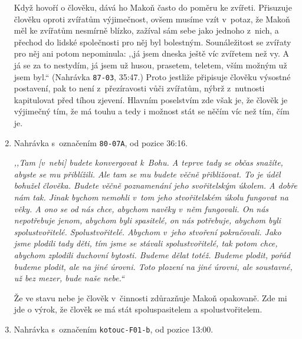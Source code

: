 \begin{enumerate}
{Když hovoří o člověku, dává ho Makoň často do poměru ke zvířeti. Přisuzuje
člověku oproti zvířatům výjimečnost, ovšem musíme vzít v~potaz, že Makoň měl ke
zvířatům nesmírně blízko, zažíval sám sebe jako jednoho z~nich, a přechod do
lidské společnosti pro něj byl bolestným\cite{KaMaUZ}. Sounáležitost se zvířaty
pro něj ani potom nepominula: ,,já jsem dneska ještě víc zvířetem než vy. A já
se za to nestydím, já jsem už husou, prasetem, teletem, vším možným už jsem
byl.`` (Nahrávka \texttt{87-03}, 35:47.) Proto jestliže připisuje člověku
výsostné postavení, pak to není z~přezíravosti vůči zvířatům, nýbrž z~nutnosti
kapitulovat před tíhou zjevení.
Hlavním poselstvím zde však je, že člověk je výjimečný tím, že má touhu a tedy i
možnost stát se něčím víc než tím, čím je.

}

\item{
Nahrávka s~označením \texttt{80-07A}, od pozice 36:16.

\textit{%
,,Tam [v~nebi] budete konvergovat k~Bohu. A teprve tady se občas snažíte, abyste se mu
přiblížili. Ale tam se mu budete věčně přibližovat. To je úděl bohužel člověka.
Budete věčně poznamenání jeho svořitelským úkolem. A dobře nám tak. Jinak bychom
nemohli v~tom jeho stvořitelském úkolu fungovat na věky. A ono se od nás chce,
abychom navěky v~něm fungovali. On nás nepotřebuje jenom, abychom byli
spasitelé, on nás potřebuje, abychom byli spolustvořitelé. Spolustvořitelé.
Abychom v~jeho stvoření pokračovali. Jako jsme plodili tady děti, tím jsme se
stávali spolustvořitelé, tak potom chce, abychom zplodili duchovní bytosti.
Budeme dělat totéž. Budeme plodit, pořád budeme plodit, ale na jiné úrovni. Toto
plození na jiné úrovni, ale soustavné, už bez mezer, bude naše nebe.``
}

Že ve stavu nebe je člověk v~činnosti zdůrazňuje Makoň opakovaně. Zde mi jde o
výrok, že člověk se má stát spoluspasitelem a spolustvořitelem.

}

\item{
Nahrávka s~označením \texttt{kotouc-F01-b}, od pozice 13:00.

}
\end{enumerate}
